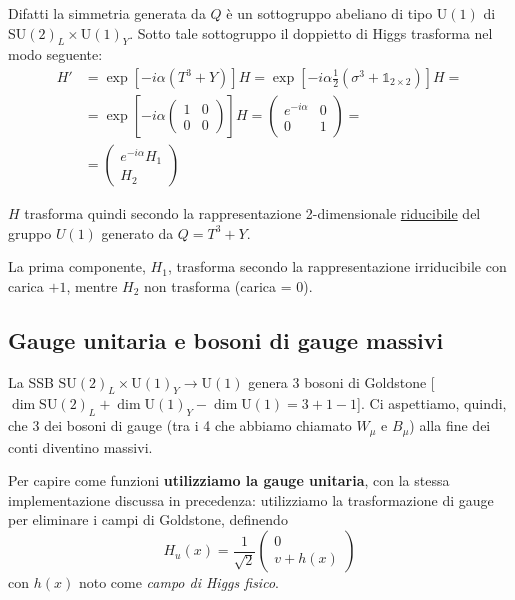 \documentclass[../main.tex]{subfiles}
\begin{document}
Difatti la simmetria generata da $Q$ è un sottogruppo abeliano di tipo U$(1)$ di SU$(2)_L\times$U$(1)_Y$. Sotto tale sottogruppo il doppietto di Higgs trasforma nel modo seguente:
\begin{align*}
    H' &= \exp[-i\alpha(T^3+Y)]H = \exp[-i\alpha\frac{1}{2}(\sigma^3 + \mathbb1_{2\times2})]H =\\
    &= \exp[-i\alpha\begin{pmatrix} 1 & 0\\ 0 & 0 \end{pmatrix}]H = \begin{pmatrix} e^{-i\alpha} & 0\\ 0 & 1 \end{pmatrix} =\\
    &=\begin{pmatrix} e^{-i\alpha}H_1\\ H_2 \end{pmatrix}
\end{align*}

$H$ trasforma quindi secondo la rappresentazione 2-dimensionale \underline{riducibile} del gruppo $U(1)$ generato da $Q = T^3 + Y$. 

La prima componente, $H_1$, trasforma secondo la rappresentazione irriducibile con carica $+1$, mentre $H_2$ non trasforma (carica = 0).

\subsection{Gauge unitaria e bosoni di gauge massivi}

La SSB $\text{SU}(2)_L\times\text{U}(1)_Y \rightarrow \text{U}(1)$ genera 3 bosoni di Goldstone [$\dim\text{SU}(2)_L+ \dim\text{U}(1)_Y - \dim\text{U}(1) = 3+1-1$]. Ci aspettiamo, quindi, che 3 dei bosoni di gauge (tra i 4 che abbiamo chiamato $W_\mu$ e $B_\mu$) alla fine dei conti diventino massivi.

Per capire come funzioni \textbf{utilizziamo la gauge unitaria}, con la stessa implementazione discussa in precedenza: utilizziamo la trasformazione di gauge per eliminare i campi di Goldstone, definendo
\begin{equation}
    \boxed{H_u(x) = \frac{1}{\sqrt2}\begin{pmatrix} 0 \\ v+h(x) \end{pmatrix}}
    \label{eq:unitary_gauged_higgs_field}
\end{equation}
con $h(x)$ noto come \textit{campo di Higgs fisico}.
\end{document}
